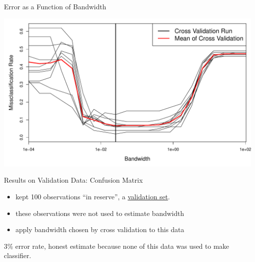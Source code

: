 \documentclass[12pt]{beamer}
\begin{document}
\begin{frame}{Error as a Function of Bandwidth}

  \begin{center}
    \includegraphics[scale=0.4]{figs/kde_cv.pdf}
  \end{center}
  
\end{frame}



\begin{frame}{Results on Validation Data: Confusion Matrix}

\begin{itemize}
\item kept 100 observations ``in reserve'', a \underline{validation set}.
\item these observations were not used to estimate bandwidth
\item apply bandwidth chosen by cross validation to this data
\end{itemize}
  
\begin{center}

\end{center}

3\% error rate, honest estimate because none of this data was used to make classifier.
  
\end{frame}
\end{document}
